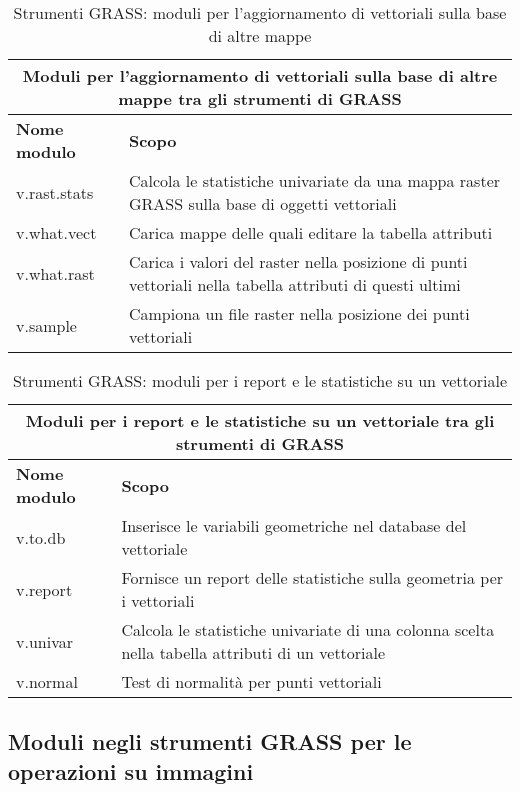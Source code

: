 \begin{table}[ht]
\centering
\caption{Strumenti GRASS: moduli per l'aggiornamento di vettoriali sulla base di altre mappe}\medskip
 \begin{tabular}{|p{4cm}|p{12cm}|}
  \hline \multicolumn{2}{|c|}{\textbf{Moduli per l'aggiornamento di vettoriali sulla base di altre mappe tra gli strumenti di GRASS}} \\
  \hline \textbf{Nome modulo} & \textbf{Scopo} \\
  \hline v.rast.stats & Calcola le statistiche univariate da una mappa raster GRASS sulla base di oggetti vettoriali \\
  \hline v.what.vect & Carica mappe delle quali editare la tabella attributi \\
  \hline v.what.rast & Carica i valori del raster nella posizione di punti vettoriali nella tabella attributi di questi ultimi \\
  \hline v.sample & Campiona un file raster nella posizione dei punti vettoriali \\
\hline
\end{tabular}
\end{table}

\begin{table}[ht]
\centering
\caption{Strumenti GRASS: moduli per i report e le statistiche su un vettoriale}\medskip
 \begin{tabular}{|p{4cm}|p{12cm}|}
  \hline \multicolumn{2}{|c|}{\textbf{Moduli per i report e le statistiche su un vettoriale tra gli strumenti di GRASS}} \\
  \hline \textbf{Nome modulo} & \textbf{Scopo} \\
  \hline v.to.db & Inserisce le variabili geometriche nel database del vettoriale \\
  \hline v.report & Fornisce un report delle statistiche sulla geometria per i vettoriali \\
  \hline v.univar & Calcola le statistiche univariate di una colonna scelta nella tabella attributi di un vettoriale \\
  \hline v.normal & Test di normalità per punti vettoriali \\
\hline
\end{tabular}
\end{table}

\clearpage

\subsection{Moduli negli strumenti GRASS per le operazioni su immagini}

